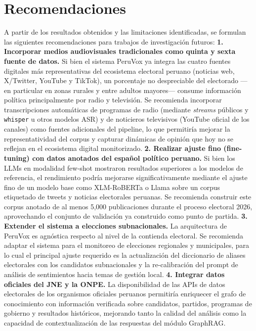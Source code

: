 \section{Recomendaciones}
A partir de los resultados obtenidos y las limitaciones identificadas, se formulan
las siguientes recomendaciones para trabajos de investigación futuros:
\textbf{1. Incorporar medios audiovisuales tradicionales como quinta y sexta
fuente de datos.} Si bien el sistema PeruVox ya integra las cuatro fuentes
digitales más representativas del ecosistema electoral peruano (noticias web,
X/Twitter, YouTube y TikTok), un porcentaje no despreciable del electorado —en
particular en zonas rurales y entre adultos mayores— consume información
política principalmente por radio y televisión. Se recomienda incorporar
transcripciones automáticas de programas de radio (mediante \textit{streams}
públicos y \texttt{whisper} u otros modelos ASR) y de noticieros televisivos
(YouTube oficial de los canales) como fuentes adicionales del pipeline, lo que
permitiría mejorar la representatividad del corpus y capturar dinámicas de
opinión que hoy no se reflejan en el ecosistema digital monitorizado.
\textbf{2. Realizar ajuste fino (fine-tuning) con datos anotados del español
político peruano.} Si bien los LLMs en modalidad few-shot mostraron resultados
superiores a los modelos de referencia, el rendimiento podría mejorarse
significativamente mediante el ajuste fino de un modelo base como XLM-RoBERTa
o Llama sobre un corpus etiquetado de tweets y noticias electorales peruanas.
Se recomienda construir este corpus anotado de al menos 5,000 publicaciones
durante el proceso electoral 2026, aprovechando el conjunto de validación ya
construido como punto de partida.
\textbf{3. Extender el sistema a elecciones subnacionales.} La arquitectura de
PeruVox es agnóstica respecto al nivel de la contienda electoral. Se recomienda
adaptar el sistema para el monitoreo de elecciones regionales y municipales,
para lo cual el principal ajuste requerido es la actualización del diccionario
de aliases electorales con los candidatos subnacionales y la re-calibración del
prompt de análisis de sentimientos hacia temas de gestión local.
\textbf{4. Integrar datos oficiales del JNE y la ONPE.} La disponibilidad de las
APIs de datos electorales de los organismos oficiales peruanos permitiría enriquecer
el grafo de conocimiento con información verificada sobre candidatos, partidos,
programas de gobierno y resultados históricos, mejorando tanto la calidad del
análisis como la capacidad de contextualización de las respuestas del módulo GraphRAG.
